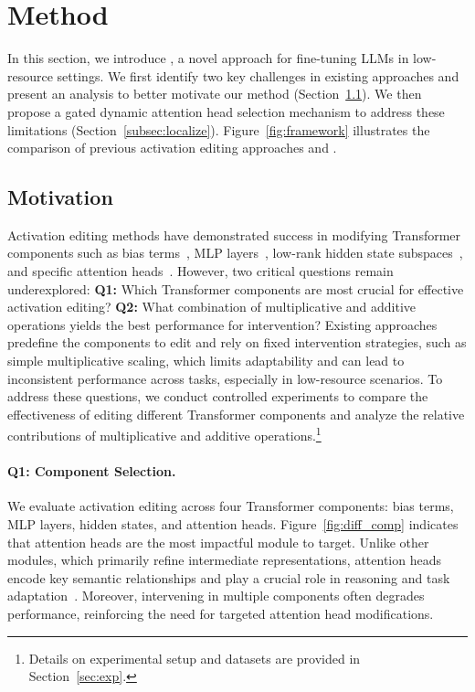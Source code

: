 \section{Method}
\label{sec:method}
In this section, we introduce \jola{}, a novel approach for fine-tuning LLMs in low-resource settings.
We first identify two key challenges in existing approaches and present an analysis to better motivate our method (Section~\ref{subsec:motivation}).
We then propose a gated dynamic attention head selection mechanism to address these limitations (Section~\ref{subsec:localize}).
Figure~\ref{fig:framework} illustrates the comparison of previous activation editing approaches and \jola{}.



\subsection{Motivation}
\label{subsec:motivation}
Activation editing methods have demonstrated success in modifying Transformer components such as bias terms~\cite{ben-zaken-etal-2022-bitfit}, MLP layers~\cite{wu-etal-2024-advancing}, low-rank hidden state subspaces~\cite{wu2024reft}, and specific attention heads~\cite{yin2024lofit}. However, two critical questions remain underexplored:
\textbf{Q1:} Which Transformer components are most crucial for effective activation editing?
\textbf{Q2:} What combination of multiplicative and additive operations yields the best performance for intervention?
Existing approaches predefine the components to edit and rely on fixed intervention strategies, such as simple multiplicative scaling, which limits adaptability and can lead to inconsistent performance across tasks, especially in low-resource scenarios.  
To address these questions, we conduct controlled experiments to compare the effectiveness of editing different Transformer components and analyze the relative contributions of multiplicative and additive operations.\footnote{Details on experimental setup and datasets are provided in Section~\ref{sec:exp}.}

\paragraph{Q1: Component Selection.} 
We evaluate activation editing across four Transformer components: bias terms, MLP layers, hidden states, and attention heads. Figure~\ref{fig:diff_comp} indicates that attention heads are the most impactful module to target.
Unlike other modules, which primarily refine intermediate representations, attention heads encode key semantic relationships and play a crucial role in reasoning and task adaptation~\cite{ren-etal-2024-identifying}.
Moreover, intervening in multiple components often degrades performance, reinforcing the need for targeted attention head modifications.

